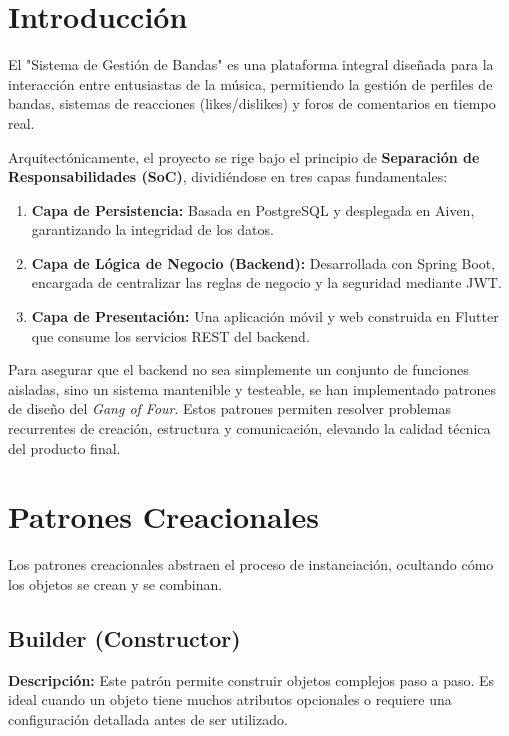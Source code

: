 \documentclass[12pt, letterpaper]{article}
\begin{document}
\newpage


\section{Introducción}
El "Sistema de Gestión de Bandas" es una plataforma integral diseñada para la interacción entre entusiastas de la música, permitiendo la gestión de perfiles de bandas, sistemas de reacciones (likes/dislikes) y foros de comentarios en tiempo real. 

Arquitectónicamente, el proyecto se rige bajo el principio de \textbf{Separación de Responsabilidades (SoC)}, dividiéndose en tres capas fundamentales:
\begin{enumerate}
    \item \textbf{Capa de Persistencia:} Basada en PostgreSQL y desplegada en Aiven, garantizando la integridad de los datos.
    \item \textbf{Capa de Lógica de Negocio (Backend):} Desarrollada con Spring Boot, encargada de centralizar las reglas de negocio y la seguridad mediante JWT.
    \item \textbf{Capa de Presentación:} Una aplicación móvil y web construida en Flutter que consume los servicios REST del backend.
\end{enumerate}

Para asegurar que el backend no sea simplemente un conjunto de funciones aisladas, sino un sistema mantenible y testeable, se han implementado patrones de diseño del \textit{Gang of Four}. Estos patrones permiten resolver problemas recurrentes de creación, estructura y comunicación, elevando la calidad técnica del producto final.


\section{Patrones Creacionales}
Los patrones creacionales abstraen el proceso de instanciación, ocultando cómo los objetos se crean y se combinan.

\subsection{Builder (Constructor)}
\textbf{Descripción:} Este patrón permite construir objetos complejos paso a paso. Es ideal cuando un objeto tiene muchos atributos opcionales o requiere una configuración detallada antes de ser utilizado.
\end{document}

